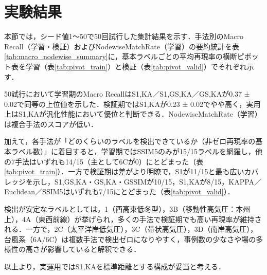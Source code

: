 \documentclass{jarticle}
\theoremstyle{definition}
\begin{document}
\section{実験結果}
本節では，シード値1〜50で50回試行した集計結果を示す．手法別のMacro Recall（学習・検証）およびNodewiseMatchRate（学習）の要約統計を表\ref{tab:macro_nodewise_summary}に，基本ラベルごとの平均再現率の横断ピボット表を学習（表\ref{tab:pivot_train}）と検証（表\ref{tab:pivot_valid}）でそれぞれ示す．

50試行において学習期のMacro RecallはS1,KA／S1,GS,KA／GS,KAが0.37 ± 0.02で同等の上位値を示した．検証期ではS1,KAが0.23 ± 0.02でやや高く，実用上はS1,KAが汎化性能において優位と判断できる．NodewiseMatchRate（学習）は複合手法のスコアが低い．

加えて，各手法が「どのくらいのラベルを検出できているか（非ゼロ再現率の基本ラベル数）」に着目すると，学習期ではSSIM5のみが15/15ラベルを網羅し，他の7手法はいずれも14/15（主として6Cが0）にとどまった（表\ref{tab:pivot_train}）．一方で検証期は差がより明瞭で，S1が11/15と最も広いカバレッジを示し，S1,GS,KA・GS,KA・GSSIMが10/15，S1,KAが8/15，KAPPA／Euclidean／SSIM5はいずれも7/15にとどまった（表\ref{tab:pivot_valid}）．

検出が安定なラベルとしては，1（西高東低冬型），3B（移動性高気圧：本州上），4A（東西前線）が挙げられ，多くの手法で検証期でも高い再現率が維持される．一方で，2C（太平洋岸低気圧），3C（帯状高気圧），3D（南岸高気圧），台風系（6A/6C）は複数手法で検出ゼロになりやすく，事例数の少なさや場の多様性の高さが影響していると解釈できる．

以上より，実運用ではS1,KAを標準距離とする構成が妥当と考える．

\begin{table}[H]
\centering
\caption{手法別 Macro Recall（学習・検証）と NodewiseMatchRate（学習）の統計量（平均±標準偏差, N=50）}
\label{tab:macro_nodewise_summary}
\end{table}
\end{document}
